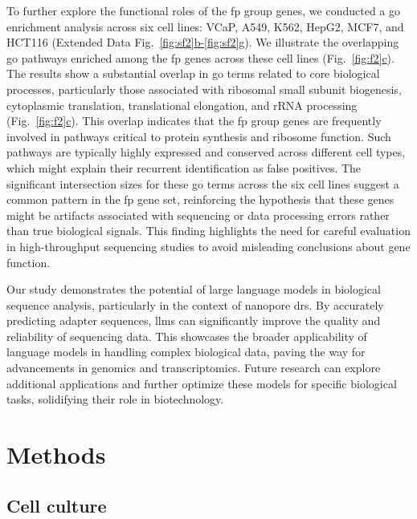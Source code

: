 \documentclass[pdflatex, sn-mathphys-num, lineno]{sn-jnl}%
\newcommand{\figref}[2]{Fig.~\hyperref[#1]{\ref*{#1}#2}}
\newcommand{\edfigrefrg}[3]{Extended Data Fig.~\hyperref[#1]{\ref*{#1}#2-\ref*{#1}#3}}
\theoremstyle{thmstyleone}%
\theoremstyle{thmstyletwo}%
\theoremstyle{thmstylethree}%
\begin{document}
To further explore the functional roles of the \gls{fp} group genes, we conducted a \gls{go} enrichment analysis across six cell lines: VCaP, A549, K562, HepG2, MCF7, and HCT116 (\edfigrefrg{fig:sf2}{b}{g}).
We illustrate the overlapping \gls{go} pathways enriched among the \gls{fp} genes across these cell lines (\figref{fig:f2}{c}).
The results show a substantial overlap in \gls{go} terms related to core biological processes, particularly those associated with ribosomal small subunit biogenesis, cytoplasmic translation, translational elongation, and rRNA processing (\figref{fig:f2}{c}).
This overlap indicates that the \gls{fp} group genes are frequently involved in pathways critical to protein synthesis and ribosome function.
Such pathways are typically highly expressed and conserved across different cell types, which might explain their recurrent identification as false positives.
The significant intersection sizes for these \gls{go} terms across the six cell lines suggest a common pattern in the \gls{fp} gene set, reinforcing the hypothesis that these genes might be artifacts associated with sequencing or data processing errors rather than true biological signals.
This finding highlights the need for careful evaluation in high-throughput sequencing studies to avoid misleading conclusions about gene function.

Our study demonstrates the potential of large language models in biological sequence analysis, particularly in the context of nanopore \gls{drs}.
By accurately predicting adapter sequences, \glspl{llm} can significantly improve the quality and reliability of sequencing data.
This showcases the broader applicability of language models in handling complex biological data, paving the way for advancements in genomics and transcriptomics.
Future research can explore additional applications and further optimize these models for specific biological tasks, solidifying their role in biotechnology.


\section{Methods}\label{sec:methods}

\subsection{Cell culture}
\end{document}
